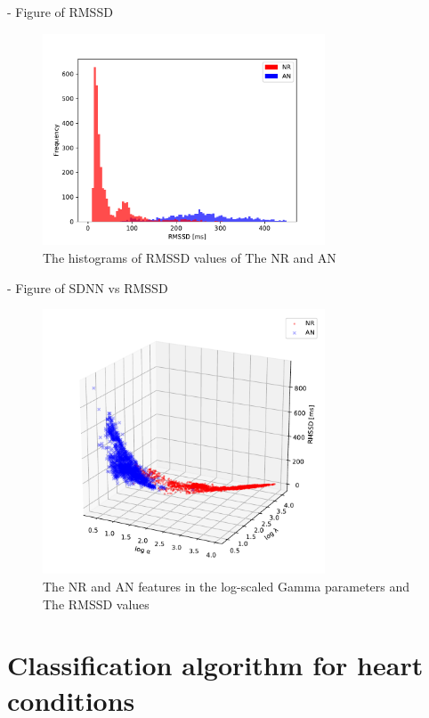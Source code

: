 \documentclass[times,twocolumn,final,authoryear]{elsarticle}
\begin{document}
- Figure of RMSSD
\begin{figure}[!t]
\centering
\includegraphics[width=8.4cm]{Fig_hist_RMSSD.pdf}
\caption{The histograms of RMSSD values of The NR and AN}
\label{fig_features_rmssd}
\end{figure}
- Figure of SDNN vs RMSSD
\begin{figure}[!t]
\centering
\includegraphics[width=8.4cm]{Fig_gamma_RMSSD.pdf}
\caption{The NR and AN features in the log-scaled Gamma parameters and The RMSSD values }
\label{fig_features_gamma_rmssd}
\end{figure}


\section{Classification algorithm for heart conditions}
\end{document}
